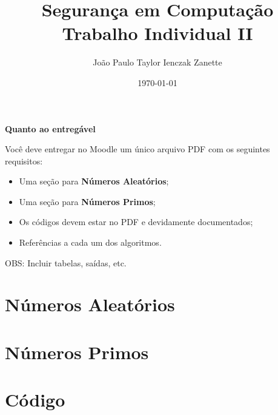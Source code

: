 \documentclass{article}
\title{%
    Segurança em Computação \\
    Trabalho Individual II
}
\author{João Paulo Taylor Ienczak Zanette}
\date{\today}
\begin{document}
    \maketitle{}

    \begin{superframe}
        \textbf{Quanto ao entregável}

        Você deve entregar no Moodle um único arquivo PDF com os seguintes requisitos:

        \begin{itemize}
            \item Uma seção para \textbf{Números Aleatórios};
            \item Uma seção para \textbf{Números Primos};
            \item Os códigos devem estar no PDF e devidamente documentados;
            \item Referências a cada um dos algoritmos.
        \end{itemize}

        OBS\@: Incluir tabelas, saídas, etc.
    \end{superframe}

    \section{Números Aleatórios}

    \section{Números Primos}

    \section{Código}

    
\end{document}
